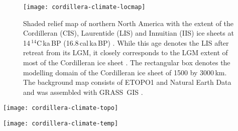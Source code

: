 
\begin{figure}[t]
	\vspace*{2mm}
	\begin{center}
		\texttt{[image: cordillera-climate-locmap]}
	\end{center}
	\caption{Shaded relief map of northern North America with the extent of the Cordilleran (CIS), Laurentide (LIS) and Innuitian (IIS) ice sheets at 14\,$^{14}$C\,ka\,BP (16.8\,cal\,ka\,BP) \citep{dyke-2004}. While this age denotes the LIS after retreat from its LGM, it closely corresponds to the LGM extent of most of the Cordilleran ice sheet \citep{porter-swanson-1998,dyke-2004,stroeven-etal-2010}. The rectangular box denotes the modelling domain of the Cordilleran ice sheet of 1500 by 3000\,km. The background map consists of ETOPO1 \citep{data:etopo1} and Natural Earth Data \citep{data:naturalearth} and was assembled with GRASS~GIS \citep{soft:grass}.}
	\label{fig:locmap}
\end{figure}

\begin{figure*}[t]
	\vspace*{2mm}
	\begin{center}
		\texttt{[image: cordillera-climate-topo]}
	\end{center}
	\caption{Topography maps from WorldClim \citep{data:worldclim}, ERA-Interim reanalysis \citep{data:erai}, North American Regional Reanalysis (NARR) \citep{data:narr}, ETOPO1 \citep{data:etopo1}, Climate System Forecast Reanalysis (CFSR) \citep{data:cfsr}, and NCEP/NCAR reanalysis \citep{data:ncar}. Whereas ETOPO1 is used as basal topography for the ice sheet model, all others are used data used as a reference for temperature lapse-rate corrections. Fig.~\ref{fig:topo}-\ref{fig:best} drawn using Matplotlib \citep{soft:mpl}.}
	\label{fig:topo}
\end{figure*}

\begin{figure*}[t]
	\vspace*{2mm}
	\begin{center}
		\texttt{[image: cordillera-climate-temp]}
	\end{center}
	\caption{Summer (JJA) and winter (DJF) temperature maps from WorldClim \citep{data:worldclim}, and summer (JJA) temperature maps from ERA-Interim reanalysis \citep{data:erai}, North American Regional Reanalysis (NARR) \citep{data:narr}, Climate System Forecast Reanalysis (CFSR) \citep{data:cfsr}, and NCEP/NCAR reanalysis \citep{data:ncar} climatologies.}
	\label{fig:temp}
\end{figure*}


